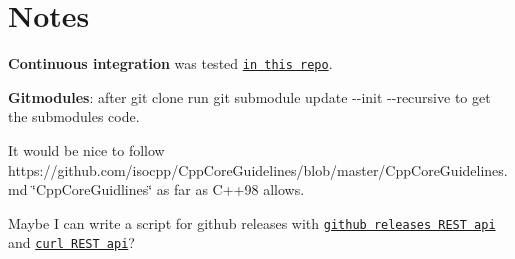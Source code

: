 \section*{Notes}


\begin{DoxyItemize}
\item {\bfseries Continuous integration} was tested \href{https://github.com/MRKonrad/ContinousIntegrationPlayground}{\tt in this repo}.
\item {\bfseries Gitmodules}\-: after {\ttfamily git clone} run {\ttfamily git submodule update -\/-\/init -\/-\/recursive} to get the submodules code.
\item It would be nice to follow https\-://github.com/isocpp/\-Cpp\-Core\-Guidelines/blob/master/\-Cpp\-Core\-Guidelines.\-md \char`\"{}\-Cpp\-Core\-Guidlines\char`\"{} as far as C++98 allows.
\item Maybe I can write a script for github releases with \href{https://developer.github.com/v3/repos/releases/#create-a-release}{\tt github releases R\-E\-S\-T api} and \href{http://www.codingpedia.org/ama/how-to-test-a-rest-api-from-command-line-with-curl/#12_HEAD_requests}{\tt curl R\-E\-S\-T api}? 
\end{DoxyItemize}